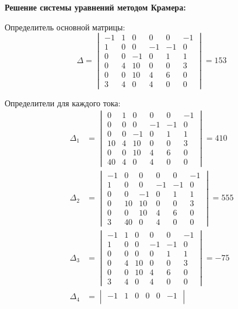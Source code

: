 \textbf{Решение системы уравнений методом Крамера:}

Определитель основной матрицы:
\begin{equation}
\Delta = \begin{vmatrix}
-1 &  1 &  0 &  0 &  0 & -1 \\
 1 &  0 &  0 & -1 & -1 &  0 \\
 0 &  0 & -1 &  0 &  1 &  1 \\
 0 &  4 & 10 &  0 &  0 &  3 \\
 0 &  0 & 10 &  4 &  6 &  0 \\
 3 &  4 &  0 &  4 &  0 &  0
\end{vmatrix} = 153
\end{equation}

Определители для каждого тока:
\begin{align}
\Delta_1 &= \begin{vmatrix}
0 &  1 &  0 &  0 &  0 & -1 \\
0 &  0 &  0 & -1 & -1 &  0 \\
0 &  0 & -1 &  0 &  1 &  1 \\
10 &  4 & 10 &  0 &  0 &  3 \\
0 &  0 & 10 &  4 &  6 &  0 \\
40 &  4 &  0 &  4 &  0 &  0
\end{vmatrix} = 410 \\
\Delta_2 &= \begin{vmatrix}
-1 &  0 &  0 &  0 &  0 & -1 \\
 1 &  0 &  0 & -1 & -1 &  0 \\
 0 &  0 & -1 &  0 &  1 &  1 \\
 0 & 10 & 10 &  0 &  0 &  3 \\
 0 &  0 & 10 &  4 &  6 &  0 \\
 3 & 40 &  0 &  4 &  0 &  0
\end{vmatrix} = 555 \\
\Delta_3 &= \begin{vmatrix}
-1 &  1 &  0 &  0 &  0 & -1 \\
 1 &  0 &  0 & -1 & -1 &  0 \\
 0 &  0 &  0 &  0 &  1 &  1 \\
 0 &  4 & 10 &  0 &  0 &  3 \\
 0 &  0 & 10 &  4 &  6 &  0 \\
 3 &  4 &  0 &  4 &  0 &  0
\end{vmatrix} = -75 \\
\Delta_4 &= \begin{vmatrix}
-1 &  1 &  0 &  0 &  0 & -1 \\

\end{vmatrix}
\end{align}
